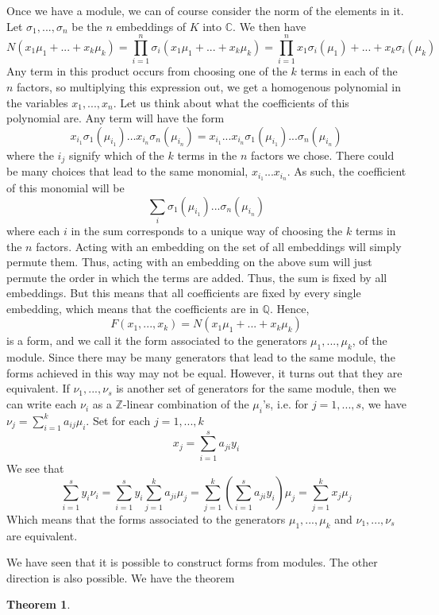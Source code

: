 \documentclass{article}
\newtheorem{theorem}{Theorem}[section]
\newcommand{\mbb}[1]{\mathbb{#1}}
\begin{document}
Once we have a module, we can of course consider the norm of the elements in it. Let $\sigma_1, ..., \sigma_n$ be the $n$ embeddings of $K$ into $\mbb{C}$. We then have
$$N(x_1 \mu_1 + ... + x_k \mu_k) = \prod_{i = 1}^n \sigma_i(x_1 \mu_1 + ... + x_k \mu_k) = \prod_{i = 1}^n x_1 \sigma_i(\mu_1) + ... + x_k \sigma_i(\mu_k)$$
Any term in this product occurs from choosing one of the $k$ terms in each of the $n$ factors, so multiplying this expression out, we get a homogenous polynomial in the variables $x_1, ..., x_n$. Let us think about what the coefficients of this polynomial are. Any term will have the form
$$x_{i_1}\sigma_1(\mu_{i_1}) \dots x_{i_n}\sigma_n(\mu_{i_n}) = x_{i_1} ... x_{i_n} \sigma_1(\mu_{i_1})... \sigma_n(\mu_{i_n})$$
where the $i_j$ signify which of the $k$ terms in the $n$ factors we chose. There could be many choices that lead to the same monomial, $x_{i_1}...x_{i_n}$. As such, the coefficient of this monomial will be
$$\sum_{i} \sigma_1(\mu_{i_1})... \sigma_n(\mu_{i_n})$$
where each $i$ in the sum corresponds to a unique way of choosing the $k$ terms in the $n$ factors. Acting with an embedding on the set of all embeddings will simply permute them. Thus, acting with an embedding on the above sum will just permute the order in which the terms are added. Thus, the sum is fixed by all embeddings. But this means that all coefficients are fixed by every single embedding, which means that the coefficients are in $\mbb{Q}$. Hence, $$F(x_1, ..., x_k) = N(x_1 \mu_1 + ... + x_k \mu_k)$$ 
is a form, and we call it the form associated to the generators $\mu_1, ..., \mu_k$, of the module. Since there may be many generators that lead to the same module, the forms achieved in this way may not be equal. However, it turns out that they are equivalent. If $\nu_1, ...,\nu_s$ is another set of generators for the same module, then we can write each $\nu_i$ as a $\mbb{Z}$-linear combination of the $\mu_i$'s, i.e. for $j = 1, ..., s$, we have
$\nu_j = \sum_{i=1}^k a_{ij} \mu_i$. Set for each $j = 1, ..., k$ 
$$x_j = \sum_{i=1}^s a_{ji} y_i$$
We see that
$$\sum_{i=1}^s y_i \nu_i = \sum_{i=1}^s y_i \sum_{j=1}^k a_{ji} \mu_j = \sum_{j=1}^k (\sum_{i=1}^s a_{ji} y_i) \mu_j = \sum_{j=1}^k x_j \mu_j$$
Which means that the forms associated to the generators $\mu_1, ..., \mu_k$ and $\nu_1, ..., \nu_s$ are equivalent. 

We have seen that it is possible to construct forms from modules. The other direction is also possible. We have the theorem

\begin{theorem}
\end{theorem}
\end{document}
